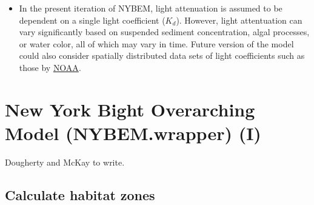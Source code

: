 \documentclass[
]{book}
\begin{document}
\begin{itemize}
\item
  In the present iteration of NYBEM, light attenuation is assumed to be dependent on a single light coefficient (\(K_{d}\)). However, light attentuation can vary significantly based on suspended sediment concentration, algal processes, or water color, all of which may vary in time. Future version of the model could also consider spatially distributed data sets of light coefficients such as those by \href{https://www.fisheries.noaa.gov/inport/item/66148}{NOAA}.
\end{itemize}

\hypertarget{new-york-bight-overarching-model-nybem.wrapper-i}{%
\section{New York Bight Overarching Model (NYBEM.wrapper) (I)}\label{new-york-bight-overarching-model-nybem.wrapper-i}}

{Dougherty and McKay to write.}

\hypertarget{calculate-habitat-zones}{%
\subsection{Calculate habitat zones}\label{calculate-habitat-zones}}
\end{document}
